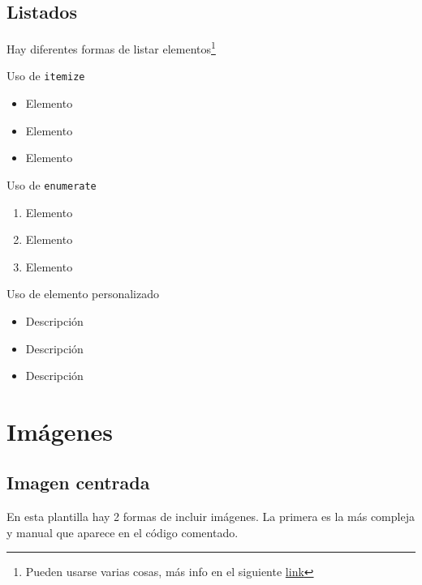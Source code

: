 \documentclass[../main.tex]{subfiles}
\begin{document}
\subsection{Listados}
Hay diferentes formas de listar elementos\footnote{Pueden usarse varias cosas, más info en el siguiente \href{https://es.overleaf.com/learn/latex/Lists}{link}}
\begin{multicols}{3}
    Uso de \texttt{itemize}
    \begin{itemize}
        \centering
        \item Elemento
        \item Elemento
        \item Elemento
    \end{itemize}
    
    \columnbreak %
    
    Uso de \texttt{enumerate}
    \begin{enumerate}
        \centering
        \item Elemento
        \item Elemento
        \item Elemento
    \end{enumerate}
    
    \columnbreak%
    
    Uso de elemento personalizado
    \begin{itemize}[$\blacksquare$] %
        \centering
        \item Descripción
        \item Descripción
        \item Descripción
    \end{itemize}
\end{multicols}


\newpage
\section{Imágenes}
\subsection{Imagen centrada}
En esta plantilla hay 2 formas de incluir imágenes. La primera es la más compleja y manual que aparece en el código comentado.
\end{document}
